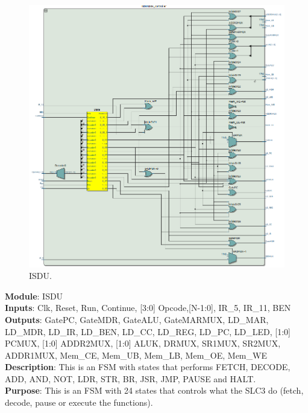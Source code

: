 \documentclass[12pt]{article}
\begin{document}
\begin{figure}[H]
    \centering
    \includegraphics[width=15cm]{ISDU.png}
    \caption{ISDU.}
\end{figure}
\textbf{Module}: ISDU \\ 
\textbf{Inputs}: Clk, Reset, Run, Continue, [3:0] Opcode,[N-1:0], IR\_5, IR\_11, BEN \\ 
\textbf{Outputs}: GatePC, GateMDR, GateALU, GateMARMUX, LD\_MAR, LD\_MDR, LD\_IR, LD\_BEN, LD\_CC, LD\_REG, LD\_PC, LD\_LED, [1:0] PCMUX, [1:0] ADDR2MUX, [1:0] ALUK, DRMUX, SR1MUX, SR2MUX, ADDR1MUX, Mem\_CE, Mem\_UB, Mem\_LB, Mem\_OE, Mem\_WE \\ 
\textbf{Description}: This is an FSM with states that performs FETCH, DECODE, ADD, AND, NOT, LDR, STR, BR, JSR, JMP, PAUSE and HALT. \\
\textbf{Purpose}: This is an FSM with 24 states that controls what the SLC3 do (fetch, decode, pause or execute the functions). \\
\end{document}
